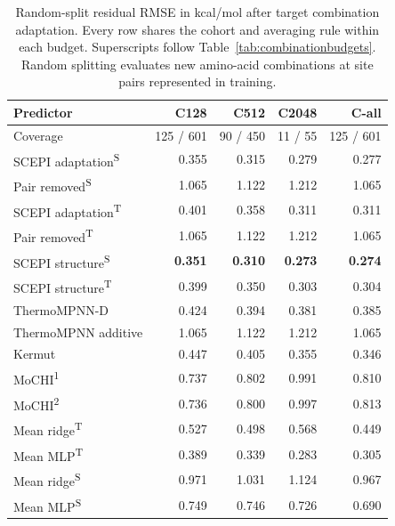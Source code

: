 \documentclass{llncs}
\begin{document}
\begin{table}[H]
\centering
\setlength{\tabcolsep}{4pt}
\caption{Random-split residual RMSE in kcal/mol after target combination adaptation. Every row shares the cohort and averaging rule within each budget. Superscripts follow Table~\ref{tab:combinationbudgets}. Random splitting evaluates new amino-acid combinations at site pairs represented in training.}
\label{tab:combinationrandom}
\begin{tabular}{lrrrr}
\toprule
Predictor & C128 & C512 & C2048 & C-all \\
\midrule
Coverage & 125 / 601 & 90 / 450 & 11 / 55 & 125 / 601 \\
\midrule
SCEPI adaptation\textsuperscript{S} & 0.355 & 0.315 & 0.279 & 0.277 \\
Pair removed\textsuperscript{S} & 1.065 & 1.122 & 1.212 & 1.065 \\
SCEPI adaptation\textsuperscript{T} & 0.401 & 0.358 & 0.311 & 0.311 \\
Pair removed\textsuperscript{T} & 1.065 & 1.122 & 1.212 & 1.065 \\
SCEPI structure\textsuperscript{S} & \textbf{0.351} & \textbf{0.310} & \textbf{0.273} & \textbf{0.274} \\
SCEPI structure\textsuperscript{T} & 0.399 & 0.350 & 0.303 & 0.304 \\
ThermoMPNN-D & 0.424 & 0.394 & 0.381 & 0.385 \\
ThermoMPNN additive & 1.065 & 1.122 & 1.212 & 1.065 \\
Kermut & 0.447 & 0.405 & 0.355 & 0.346 \\
MoCHI\textsuperscript{1} & 0.737 & 0.802 & 0.991 & 0.810 \\
MoCHI\textsuperscript{2} & 0.736 & 0.800 & 0.997 & 0.813 \\
Mean ridge\textsuperscript{T} & 0.527 & 0.498 & 0.568 & 0.449 \\
Mean MLP\textsuperscript{T} & 0.389 & 0.339 & 0.283 & 0.305 \\
Mean ridge\textsuperscript{S} & 0.971 & 1.031 & 1.124 & 0.967 \\
Mean MLP\textsuperscript{S} & 0.749 & 0.746 & 0.726 & 0.690 \\
\bottomrule
\end{tabular}
\end{table}
\end{document}
